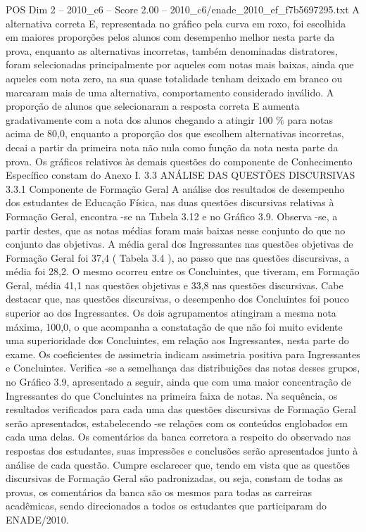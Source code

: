 \begin{textsample}{POS Dim 2 – 2010\_c6 – Score 2.00 – 2010\_c6/enade\_2010\_ef\_f7b5697295.txt}
A alternativa correta E, representada no gráfico pela curva em roxo, foi escolhida em maiores proporções pelos alunos com desempenho melhor nesta parte da prova, enquanto as alternativas incorretas, também denominadas distratores, foram selecionadas principalmente por aqueles com notas mais baixas, ainda que aqueles com nota zero, na sua quase totalidade tenham deixado em branco ou marcaram mais de uma alternativa, comportamento considerado inválido.
A proporção de alunos que selecionaram a resposta correta E aumenta gradativamente com a nota dos alunos chegando a atingir 100 \% para notas acima de 80,0, enquanto a proporção dos que escolhem alternativas incorretas, decai a partir da primeira nota não nula como função da nota nesta parte da prova.
Os gráficos relativos às demais questões do componente de Conhecimento Específico constam do Anexo I. 3.3 ANÁLISE DAS QUESTÕES DISCURSIVAS 3.3.1 Componente de Formação Geral A análise dos resultados de desempenho dos estudantes de Educação Física, nas duas questões discursivas relativas à Formação Geral, encontra -se na Tabela 3.12 e no Gráfico 3.9.
Observa -se, a partir destes, que as notas médias foram mais baixas nesse conjunto do que no conjunto das objetivas.
A média geral dos Ingressantes nas questões objetivas de Formação Geral foi 37,4 ( Tabela 3.4 ), ao passo que nas questões discursivas, a média foi 28,2.
O mesmo ocorreu entre os Concluintes, que tiveram, em Formação Geral, média 41,1 nas questões objetivas e 33,8 nas questões discursivas.
Cabe destacar que, nas questões discursivas, o desempenho dos Concluintes foi pouco superior ao dos Ingressantes.
Os dois agrupamentos atingiram a mesma nota máxima, 100,0, o que acompanha a constatação de que não foi muito evidente uma superioridade dos Concluintes, em relação aos Ingressantes, nesta parte do exame.
Os coeficientes de assimetria indicam assimetria positiva para Ingressantes e Concluintes.
Verifica -se a semelhança das distribuições das notas desses grupos, no Gráfico 3.9, apresentado a seguir, ainda que com uma maior concentração de Ingressantes do que Concluintes na primeira faixa de notas.
Na sequência, os resultados verificados para cada uma das questões discursivas de Formação Geral serão apresentados, estabelecendo -se relações com os conteúdos englobados em cada uma delas.
Os comentários da banca corretora a respeito do observado nas respostas dos estudantes, suas impressões e conclusões serão apresentados junto à análise de cada questão.
Cumpre esclarecer que, tendo em vista que as questões discursivas de Formação Geral são padronizadas, ou seja, constam de todas as provas, os comentários da banca são os mesmos para todas as carreiras acadêmicas, sendo direcionados a todos os estudantes que participaram do ENADE/2010.

\end{textsample}

